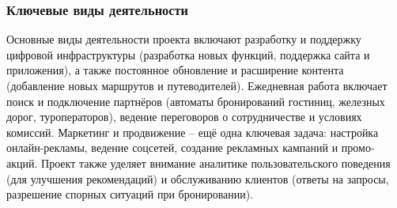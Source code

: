 \subsubsection*{Ключевые виды деятельности}
Основные виды деятельности проекта включают разработку и поддержку цифровой инфраструктуры (разработка новых функций, поддержка сайта и приложения), а также постоянное обновление и расширение контента (добавление новых маршрутов и путеводителей). Ежедневная работа включает поиск и подключение партнёров (автоматы бронирований гостиниц, железных дорог, туроператоров), ведение переговоров о сотрудничестве и условиях комиссий. Маркетинг и продвижение – ещё одна ключевая задача: настройка онлайн-рекламы, ведение соцсетей, создание рекламных кампаний и промо-акций. Проект также уделяет внимание аналитике пользовательского поведения (для улучшения рекомендаций) и обслуживанию клиентов (ответы на запросы, разрешение спорных ситуаций при бронировании).

